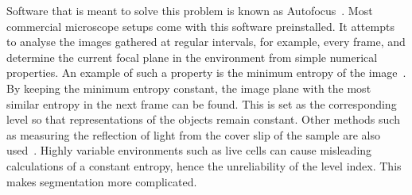 Software that is meant to solve this problem is known as Autofocus~\cite{Firestone:91}\cite{Leica}. Most commercial microscope setups come with this software preinstalled. It attempts to analyse the images gathered at regular intervals, for example, every frame, and determine the current focal plane in the environment from simple numerical properties. An example of such a property is the minimum entropy of the image~\cite{Firestone:91}. By keeping the minimum entropy constant, the image plane with the most similar entropy in the next frame can be found. This is set as the corresponding level so that representations of the objects remain constant. Other methods such as measuring the reflection of light from the cover slip of the sample are also used~\cite{Poland:08}. Highly variable environments such as live cells can cause misleading calculations of a constant entropy, hence the unreliability of the level index. This makes segmentation more complicated.
